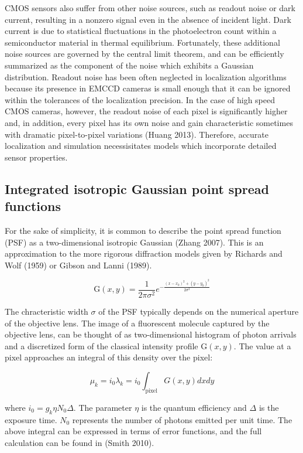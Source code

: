 \documentclass{ucetd}
\begin{document}
CMOS sensors also suffer from other noise sources, such as readout noise or dark current, resulting in a nonzero signal even in the absence of incident light. Dark current is due to statistical fluctuations in the photoelectron count within a semiconductor material in thermal equilibrium. Fortunately, these additional noise sources are governed by the central limit theorem, and can be efficiently summarized as the component of the noise which exhibits a Gaussian distribution. Readout noise has been often neglected in localization algorithms because its presence in EMCCD cameras is small enough that it can be ignored within the tolerances of the localization precision. In the case of high speed CMOS cameras, however, the readout noise of each pixel is significantly higher and, in addition, every pixel has its own noise and gain characteristic sometimes with dramatic pixel-to-pixel variations (Huang 2013). Therefore, accurate localization and simulation necessisitates models which incorporate detailed sensor properties. 


\subsection{Integrated isotropic Gaussian point spread functions}

For the sake of simplicity, it is common to describe the point spread function (PSF) as a two-dimensional isotropic Gaussian (Zhang 2007). This is an approximation to the more rigorous diffraction models given by Richards and Wolf (1959) or Gibson and Lanni (1989). 

\begin{equation*}
\mathrm{G}(x,y) = \frac{1}{2\pi\sigma^{2}}e^{-\frac{(x-x_{0})^{2}+(y-y_{0})^{2}}{2\sigma^{2}}}
\end{equation*}

The chracteristic width $\sigma$ of the PSF typically depends on the numerical aperture of the objective lens. The image of a fluorescent molecule captured by the objective lens, can be thought of as two-dimensional histogram of photon arrivals and a discretized form of the classical intensity profile $\mathrm{G}(x,y)$. The value at a pixel approaches an integral of this density over the pixel:

\begin{equation}
\mu_{k} = i_{0}\lambda_{k} = i_{0}\int_{\mathrm{pixel}} G(x,y)dxdy
\end{equation}

where $i_{0} = g_{k}\eta N_{0}\Delta$. The parameter $\eta$ is the quantum efficiency and $\Delta$ is the exposure time. $N_{0}$ represents the number of photons emitted per unit time. The above integral can be expressed in terms of error functions, and the full calculation can be found in (Smith 2010). 
\end{document}
